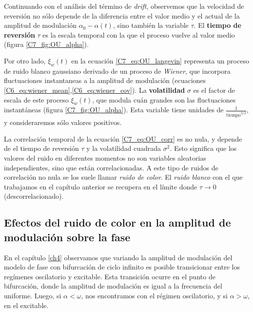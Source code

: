 \documentclass[./main.tex]{subfiles}
\begin{document}
Continuando con el análisis del término de \textit{drift}, observemos que la velocidad de reversión no sólo depende de la diferencia entre el valor medio y el actual de la amplitud de modulación $\alpha_0 - \alpha(t)$, sino también la variable $\tau$. El \textbf{tiempo de reversión} $\tau$ es la escala temporal con la que el proceso vuelve al valor medio (figura \ref{C7_fig:OU_alpha}).


Por otro lado, $\xi_w(t)$ en la ecuación \ref{C7_eq:OU_langevin} representa un proceso de ruido blanco gaussiano derivado de un proceso de \emph{Wiener}, que incorpora fluctuaciones instantaneas a la amplitud de modulación (ecuaciones \ref{C6_eq:wiener_mean},\ref{C6_eq:wiener_cov}). La \textbf{volatilidad} $\sigma$ es el factor de escala de este proceso $\xi_w(t)$, que modula cuán grandes son las fluctuaciones instantáneas  (figura \ref{C7_fig:OU_alpha}). Esta variable tiene unidades de $\frac{1}{\text{tiempo}^{3/2}}$, y consideraremos sólo valores positivos. 


La correlación temporal de la ecuación \ref{C7_eq:OU_corr} es no nula, y depende de el tiempo de reversión $\tau$ y la volatilidad cuadrada $\sigma^2$. Esto significa que los valores del ruido en diferentes momentos no son variables aleatorias independientes, sino que están correlacionadas. A este tipo de ruidos de correlación no nula se los suele llamar \emph{ruido de color}. El \emph{ruido blanco} con el que trabajamos en el capítulo anterior se recupera en el límite donde $\tau \rightarrow 0$ (descorrelacionado). 




\subsection{Efectos del ruido de color en la amplitud de modulación sobre la fase}

En el capítulo \ref{ch4} observamos que variando la amplitud de modulación del modelo de fase con bifurcación de ciclo infinito es posible transicionar entre los regímenes oscilatorio y excitable. Esta transición ocurre en el punto de bifurcación, donde la amplitud de modulación es igual a la frecuencia del uniforme. Luego, si $\alpha < \omega$, nos encontramos con el régimen oscilatorio, y si $\alpha > \omega$, en el excitable. 
\end{document}

